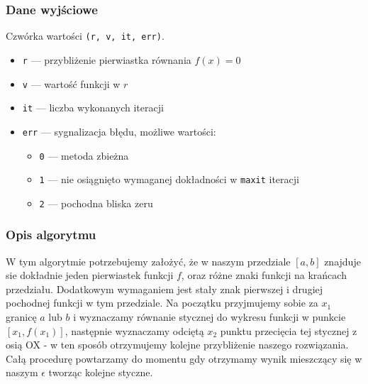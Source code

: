 \documentclass{article}
\begin{document}
\subsubsection*{Dane wyjściowe}
	Czwórka wartości \texttt{(r, v, it, err)}.
	\begin{itemize}
	    \item \texttt{r} — przybliżenie pierwiastka równania $f(x) = 0$
	    \item \texttt{v} — wartość funkcji w $r$
	    \item \texttt{it} — liczba wykonanych iteracji
	    \item \texttt{err} — sygnalizacja błędu, możliwe wartości:
	    \begin{itemize}
	        \item \texttt{0} — metoda zbieżna
	        \item \texttt{1} — nie osiągnięto wymaganej dokładności w \texttt{maxit} iteracji
	        \item \texttt{2} — pochodna bliska zeru
	    \end{itemize}
	\end{itemize}
\subsubsection*{Opis algorytmu}
	W tym algorytmie potrzebujemy założyć, że w naszym przedziale $[a, b]$ znajduje sie dokładnie jeden pierwiastek funkcji $f$, oraz różne znaki funkcji na krańcach przedziału. Dodatkowym wymaganiem jest stały znak pierwszej i drugiej pochodnej funkcji w tym przedziale.
	Na początku przyjmujemy sobie za $x_1$ granicę $a$ lub $b$ i wyznaczamy równanie stycznej do wykresu funkcji w punkcie $[x_1, f(x_1)]$, następnie wyznaczamy odciętą $x_2$ punktu przecięcia tej stycznej z osią OX - w ten sposób otrzymujemy kolejne przybliżenie naszego rozwiązania.\tabularnewline
	Całą procedurę powtarzamy do momentu gdy otrzymamy wynik mieszczący się w naszym $\epsilon$ tworząc kolejne styczne.
\end{document}
